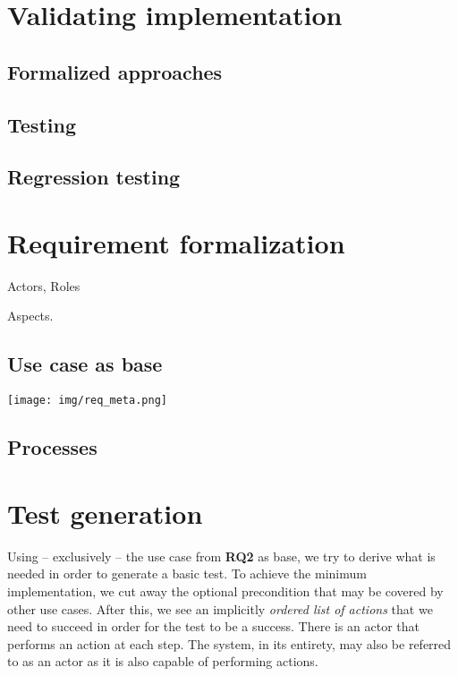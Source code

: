\documentclass[10pt]{scrreprt}
\begin{document}
\chapter{Validating implementation}

\section{Formalized approaches}
\section{Testing}

\section{Regression testing}

\chapter{Requirement formalization}
Actors, Roles

Aspects.

\section{Use case as base}
\texttt{[image: img/req\_meta.png]}

\section{Processes}

\chapter{Test generation}
Using -- exclusively -- the use case from \textbf{RQ2} as base, we try to derive what is needed in order to generate a basic test.
To achieve the minimum implementation, we cut away the optional precondition that may be covered by other use cases. After this, we see an implicitly \emph{ordered list of actions} that we need to succeed in order for the test to be a success. There is an actor that performs an action at each step. The system, in its entirety, may also be referred to as an actor as it is also capable of performing actions.
\end{document}
